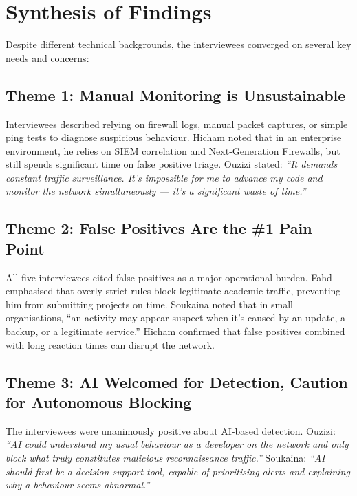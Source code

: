 \documentclass[12pt,a4paper]{report}
\begin{document}
\section{Synthesis of Findings}

Despite different technical backgrounds, the interviewees converged on several key needs and concerns:

\subsection{Theme 1: Manual Monitoring is Unsustainable}

Interviewees described relying on firewall logs, manual packet captures, or simple ping tests to diagnose suspicious behaviour. Hicham noted that in an enterprise environment, he relies on SIEM correlation and Next-Generation Firewalls, but still spends significant time on false positive triage. Ouzizi stated: \textit{``It demands constant traffic surveillance. It's impossible for me to advance my code and monitor the network simultaneously --- it's a significant waste of time.''}

\subsection{Theme 2: False Positives Are the \#1 Pain Point}

All five interviewees cited false positives as a major operational burden. Fahd emphasised that overly strict rules block legitimate academic traffic, preventing him from submitting projects on time. Soukaina noted that in small organisations, ``an activity may appear suspect when it's caused by an update, a backup, or a legitimate service.'' Hicham confirmed that false positives combined with long reaction times can disrupt the network.

\subsection{Theme 3: AI Welcomed for Detection, Caution for Autonomous Blocking}

The interviewees were unanimously positive about AI-based detection. Ouzizi: \textit{``AI could understand my usual behaviour as a developer on the network and only block what truly constitutes malicious reconnaissance traffic.''} Soukaina: \textit{``AI should first be a decision-support tool, capable of prioritising alerts and explaining why a behaviour seems abnormal.''}
\end{document}
